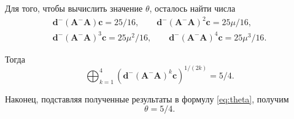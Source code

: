 \documentclass[specialist,
               substylefile = spbu.rtx,
               subf,href,colorlinks=true, 12pt]{disser}
\theoremstyle{definition}
\begin{document}
Для того, чтобы вычислить значение $\theta$, осталось найти числа
\begin{gather*}
\bm{d}^{-}(\bm{A}^{-}\bm{A})\bm{c}
=
25/16,
\qquad
\bm{d}^{-}(\bm{A}^{-}\bm{A})^{2}\bm{c}
=
25\mu/16,\\
\bm{d}^{-}(\bm{A}^{-}\bm{A})^{3}\bm{c}
=
25\mu^{2}/16,
\qquad
\bm{d}^{-}(\bm{A}^{-}\bm{A})^{4}\bm{c}
=
25\mu^{3}/16.
\end{gather*}

Тогда
\begin{equation*}
\bigoplus_{k=1}^{4}\left(\bm{d}^{-}(\bm{A}^{-}\bm{A})^{k}\bm{c}\right)^{1/(2k)}
=
5/4.
\end{equation*}

Наконец, подставляя полученные результаты в формулу \eqref{eq:theta}, получим
\begin{equation*}
\theta
=
5/4.
\end{equation*}

%
\end{document}
